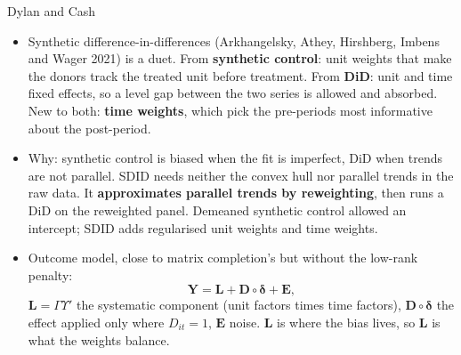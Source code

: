 \documentclass[
  11pt,
  ignorenonframetext,
  aspectratio=169,
]{beamer}
\providecommand{\tightlist}{%
  \setlength{\itemsep}{0pt}\setlength{\parskip}{0pt}}
\begin{document}
\begin{frame}{Dylan and Cash}
\protect{}\label{dylan-and-cash}
\begin{itemize}
\tightlist
\item
  Synthetic difference-in-differences (Arkhangelsky, Athey, Hirshberg,
  Imbens and Wager 2021) is a duet. From \textbf{synthetic control}:
  unit weights that make the donors track the treated unit before
  treatment. From \textbf{DiD}: unit and time fixed effects, so a level
  gap between the two series is allowed and absorbed. New to both:
  \textbf{time weights}, which pick the pre-periods most informative
  about the post-period.
\item
  Why: synthetic control is biased when the fit is imperfect, DiD when
  trends are not parallel. SDID needs neither the convex hull nor
  parallel trends in the raw data. It \textbf{approximates parallel
  trends by reweighting}, then runs a DiD on the reweighted panel.
  Demeaned synthetic control allowed an intercept; SDID adds regularised
  unit weights and time weights.
\end{itemize}

\vspace{0.4em}

\begin{itemize}
\tightlist
\item
  Outcome model, close to matrix completion's but without the low-rank
  penalty: \[
  \mathbf Y = \mathbf L + \mathbf D \circ \boldsymbol\delta + \mathbf E,
  \] \(\mathbf L = \Gamma \Upsilon'\) the systematic component (unit
  factors times time factors), \(\mathbf D \circ \boldsymbol\delta\) the
  effect applied only where \(D_{it} = 1\), \(\mathbf E\) noise.
  \(\mathbf L\) is where the bias lives, so \(\mathbf L\) is what the
  weights balance.
\end{itemize}
\end{frame}
\end{document}
